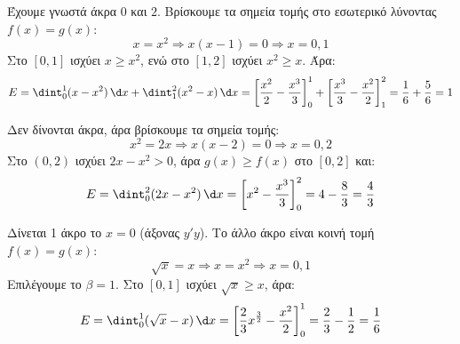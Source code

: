 \lysh\vspace{-5mm}
\begin{alist}
\item Έχουμε γνωστά άκρα $0$ και $2$. Βρίσκουμε τα σημεία τομής στο εσωτερικό λύνοντας $f(x)=g(x)$:
\[
x=x^2 \Rightarrow x(x-1)=0 \Rightarrow x=0,1
\]
Στο $[0,1]$ ισχύει $x\ge x^2$, ενώ στο $[1,2]$ ισχύει $x^2\ge x$. Άρα:
\[
E=\dint_{0}^{1}(x-x^2)\,\d x+\dint_{1}^{2}(x^2-x)\,\d x
=\left[\frac{x^2}{2}-\frac{x^3}{3}\right]_{0}^{1}+\left[\frac{x^3}{3}-\frac{x^2}{2}\right]_{1}^{2}=\frac{1}{6}+\frac{5}{6}=1
\]
\item Δεν δίνονται άκρα, άρα βρίσκουμε τα σημεία τομής:
\[
x^2=2x \Rightarrow x(x-2)=0 \Rightarrow x=0,2
\]
Στο $(0,2)$ ισχύει $2x-x^2>0$, άρα $g(x)\ge f(x)$ στο $[0,2]$ και:
\[
E=\dint_{0}^{2}(2x-x^2)\,\d x=\left[x^2-\frac{x^3}{3}\right]_{0}^{2}=4-\frac{8}{3}=\frac{4}{3}
\]
\item Δίνεται 1 άκρο το $x=0$ (άξονας $y'y$). Το άλλο άκρο είναι κοινή τομή $f(x)=g(x)$:
\[
\sqrt{x}=x \Rightarrow x=x^2 \Rightarrow x=0,1
\]
Επιλέγουμε το $\beta=1$. Στο $[0,1]$ ισχύει $\sqrt{x}\ge x$, άρα:
\[
E=\dint_{0}^{1}(\sqrt{x}-x)\,\d x=\left[\frac{2}{3}x^{\frac{3}{2}}-\frac{x^2}{2}\right]_{0}^{1}=\frac{2}{3}-\frac{1}{2}=\frac{1}{6}
\]
\end{alist}
